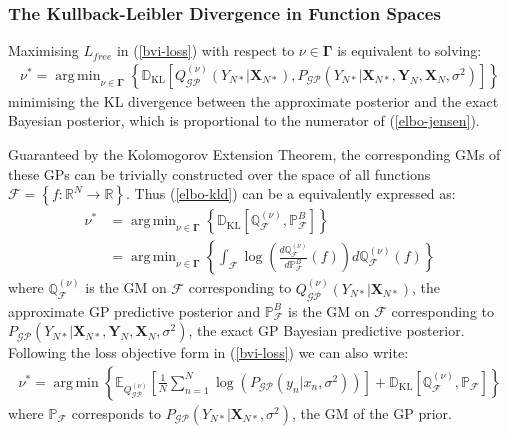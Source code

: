 \documentclass{article}
\newcommand{\KLD}{\operatorname{\mathbb{D}_{KL}}}
\newcommand{\GP}{\operatorname{\mathcal{GP}}}
\DeclareMathOperator*{\argmin}{arg\,min}
\numberwithin{equation}{section}
\begin{document}
\subsubsection{The Kullback-Leibler Divergence in Function Spaces}
Maximising $L_{free}$ in (\ref{bvi-loss}) with respect to $\nu \in \mathbf{\Gamma}$ is equivalent to solving:
\begin{align}
    \nu^* = \argmin_{\nu \in \mathbf{\Gamma}} \left\{\KLD \left[ Q_{\GP}^{(\nu)}\left(Y_{N*} \vert \mathbf{X}_{N*}\right) ,  P_{\GP}\left(Y_{N*} \vert \mathbf{X}_{N*}, \mathbf{Y}_N, \mathbf{X}_N, \sigma^2 \right) \right]\right\}
    \label{elbo-kld}
\end{align}
minimising the KL divergence between the approximate posterior and the exact Bayesian posterior, which is proportional to the numerator of (\ref{elbo-jensen}). 

Guaranteed by the Kolomogorov Extension Theorem, the corresponding GMs of these GPs can be trivially constructed over the space of all functions $\mathcal{F} = \left\{f: \mathbb{R}^{N} \rightarrow \mathbb{R} \right\}$. Thus (\ref{elbo-kld}) can be a equivalently expressed as:
\begin{align}
    \label{kld-function-spaces}
    \nu^* &=\argmin_{\nu \in \mathbf{\Gamma}}  \left\{ \KLD\left[ \mathbb{Q}^{(\nu)}_\mathcal{F},  \mathbb{P}^B_\mathcal{F} \right] \right\} \\
    &= \argmin_{\nu \in \mathbf{\Gamma}} \left\{\int_{\mathcal{F}} \log \left( \frac{d \mathbb{Q}^{(\nu)}_\mathcal{F}}{d \mathbb{P}^B_\mathcal{F}} (f)\right)d \mathbb{Q}^{(\nu)}_\mathcal{F}(f) \right\}
    \label{radon-nikodym}
\end{align}
where $\mathbb{Q}^{(\nu)}_\mathcal{F}$ is the GM on $\mathcal{F}$ corresponding to $Q_{\GP}^{(\nu)}\left(Y_{N*} \vert \mathbf{X}_{N*}\right)$, the approximate GP predictive posterior and $\mathbb{P}^B_\mathcal{F}$ is the GM on $\mathcal{F}$ corresponding to $P_{\GP}\left(Y_{N*} \vert \mathbf{X}_{N*}, \mathbf{Y}_N, \mathbf{X}_N, \sigma^2 \right)$, the exact GP Bayesian predictive posterior. Following the loss objective form in (\ref{bvi-loss}) we can also write:
\begin{align}
    \nu^* = \argmin \left\{ \mathbb{E}_{Q^{(\nu)}_{\GP}}\left[\frac{1}{N}\sum_{n=1}^N\log \left(P_{\GP}\left(y_n \vert x_n, \sigma^2\right)\right)\right] + \KLD \left[\mathbb{Q}^{(\nu)}_{\mathcal{F}}, \mathbb{P}_{\mathcal{F}} \right] \right\}
    \label{bvi-gm-loss}
\end{align}
where $\mathbb{P}_\mathcal{F}$ corresponds to $P_{\GP}\left(Y_{N*} \vert \mathbf{X}_{N*}, \sigma^2 \right)$, the GM of the GP prior.
\end{document}
